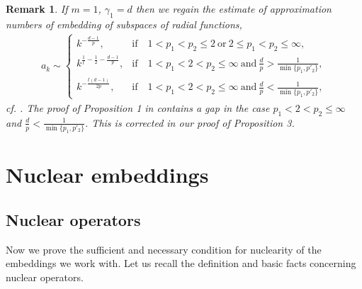 \documentclass[12pt]{article}
\newtheorem{Rem}{Remark}
\def\id{\mathop{\rm id \,}\nolimits}
\newcommand{\Rd}{{\mathbb R}^{d}}
\begin{document}
\begin{Rem} {\rm 
	If $m=1$, $\gamma_1=d$ then we regain the estimate of approximation numbers of embedding of subspaces of radial functions, 
	\begin{align*}
	a_k \sim 	\left\{ \begin{array}{ll} 
	k^{-\frac{d-1}{p}}, &{\mathrm{if}\quad 1< p_1< p_2\leq2\ \mathrm{or}\ 2\leq p_1<p_2\leq\infty,}\\   
	k^{\frac{1}{t}-\frac{1}{2}-\frac{d-1}{p}}, &{\mathrm{if}\quad 1< p_1<2< p_2 \leq\infty \ \mathrm{and}\	\frac{d}{p} > \frac{1}{\min\{p_1,p'_2\}},}\\
	k^{-\frac{t(d-1)}{2p}}, &{\mathrm{if}\quad 1< p_1<2< p_2 \leq\infty \ \mathrm{and}\ 	\frac{d}{p} < \frac{1}{\min\{p_1,p'_2\}},} 
	\end{array}\right.
	\end{align*}
	cf. \cite{ST}. The proof of Proposition 1 in \cite{ST} contains  a gap in the case  $p_1<2< p_2 \leq\infty$ and  $\frac{d}{p} < \frac{1}{\min\{p_1,p'_2\}}$. This is corrected in our proof of Proposition 3.   }
\end{Rem}


 



\section{Nuclear embeddings}

\subsection{Nuclear operators} 
Now we prove the sufficient and necessary condition for nuclearity of the embeddings we work with. Let us recall the definition and basic facts concerning nuclear operators.  
\end{document}

